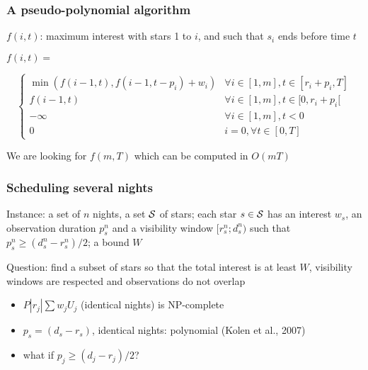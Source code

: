 \documentclass[colors]{beamer}
\begin{document}
\begin{frame}
  \frametitle{A pseudo-polynomial algorithm}
  
  $f(i,t)$: maximum interest with stars 1 to $i$, and such that $s_i$
  ends before time $t$
  
  \vfill

  $f(i,t)=$\par\kern-5mm%
  \[\left\{
    \begin{array}{ll}
      \min( f(i-1,t), f(i-1,t - p_i) + w_i) & \forall i \in [1, m], t \in[r_i+p_i, T] \\
      f(i-1,t) & \forall i \in [1, m], t \in [0, r_i+p_i[ \\
      
      -\infty& \forall i \in [1, m], t < 0\\
      0	& i = 0, \forall t \in[0, T] 
    \end{array}
  \right.\]
  \vfill
  
  We are looking for $f(m,T)$ which can be computed in $O(mT)$
\end{frame}


\begin{frame}
  \frametitle{Scheduling several nights}
  
  Instance: a set of $n$ nights, a set $\cal S$ of stars; each star
  $s\in\cal S$ has an interest $w_s$, an observation duration $p_s^n$
  and a visibility window $[r_s^n;d_s^n)$ \alert{such that $p_s^n\ge
    (d_s^n-r_s^n)/2$}; a bound $W$

  Question: find a subset of stars so that the total interest is at
  least $W$, visibility windows are respected and observations do not
  overlap

  \vfill

  \begin{itemize}
  \item<2-> $P|r_j|\sum w_jU_j$ (identical nights) is NP-complete
  \item<3-> $p_s = (d_s-r_s)$, identical nights: polynomial (Kolen et al., 2007)
  \item<4-> what if $p_j\ge (d_j-r_j)/2$?
  \end{itemize}

  \vfill
  
\end{frame}
\end{document}

